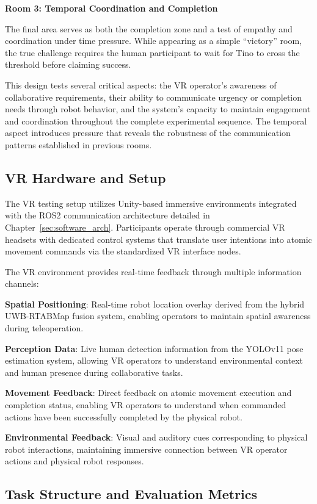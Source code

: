 \textbf{Room 3: Temporal Coordination and Completion}

The final area serves as both the completion zone and a test of empathy and coordination under time pressure. While appearing as a simple ``victory'' room, the true challenge requires the human participant to wait for Tino to cross the threshold before claiming success.

This design tests several critical aspects: the VR operator's awareness of collaborative requirements, their ability to communicate urgency or completion needs through robot behavior, and the system's capacity to maintain engagement and coordination throughout the complete experimental sequence. The temporal aspect introduces pressure that reveals the robustness of the communication patterns established in previous rooms.

\subsection{VR Hardware and Setup}

The VR testing setup utilizes Unity-based immersive environments integrated with the ROS2 communication architecture detailed in Chapter~\ref{sec:software_arch}. Participants operate through commercial VR headsets with dedicated control systems that translate user intentions into atomic movement commands via the standardized VR interface nodes.

The VR environment provides real-time feedback through multiple information channels:

\textbf{Spatial Positioning}: Real-time robot location overlay derived from the hybrid UWB-RTABMap fusion system, enabling operators to maintain spatial awareness during teleoperation.

\textbf{Perception Data}: Live human detection information from the YOLOv11 pose estimation system, allowing VR operators to understand environmental context and human presence during collaborative tasks.

\textbf{Movement Feedback}: Direct feedback on atomic movement execution and completion status, enabling VR operators to understand when commanded actions have been successfully completed by the physical robot.

\textbf{Environmental Feedback}: Visual and auditory cues corresponding to physical robot interactions, maintaining immersive connection between VR operator actions and physical robot responses.

\subsection{Task Structure and Evaluation Metrics}

